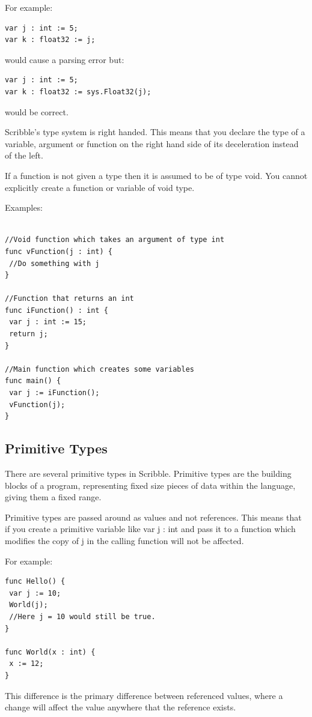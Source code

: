 \documentclass[]{final_report}
\begin{document}
For example:
\begin{verbatim}
var j : int := 5;
var k : float32 := j;
\end{verbatim}
would cause a parsing error but:
\begin{verbatim}
var j : int := 5;
var k : float32 := sys.Float32(j);
\end{verbatim}
would be correct.


Scribble's type system is right handed. This means that you declare the type of a variable, argument or function on the right hand side of its deceleration instead of the left.

If a function is not given a type then it is assumed to be of type void. You cannot explicitly create a function or variable of void type.

Examples:
\begin{verbatim}

//Void function which takes an argument of type int
func vFunction(j : int) {
 //Do something with j
}

//Function that returns an int
func iFunction() : int {
 var j : int := 15;
 return j;
}

//Main function which creates some variables
func main() {
 var j := iFunction();
 vFunction(j);
}
\end{verbatim}

\subsection{Primitive Types}

There are several primitive types in Scribble. Primitive types are the building blocks of a program, representing fixed size pieces of data within the language, giving them a fixed range.

Primitive types are passed around as values and not references. This means that if you create a primitive variable like var j : int and pass it to a function which modifies the copy of j in the calling function will not be affected.

For example: \begin{verbatim}
func Hello() {
 var j := 10;
 World(j);
 //Here j = 10 would still be true.
}

func World(x : int) {
 x := 12;
}
\end{verbatim}

This difference is the primary difference between referenced values, where a change will affect the value anywhere that the reference exists.
\end{document}
